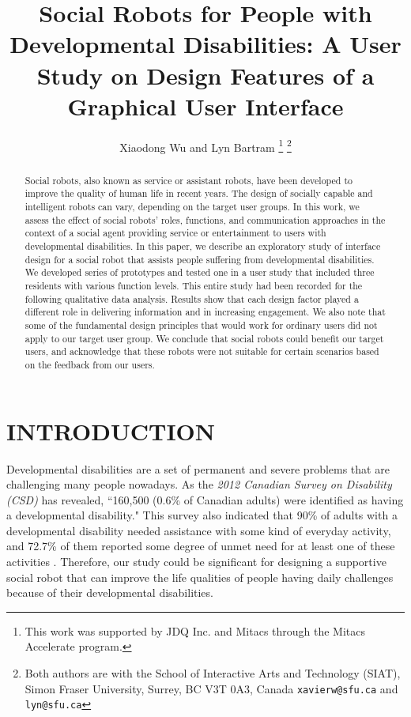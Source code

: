 \documentclass[letterpaper, 10 pt, conference]{ieeeconf}  %
\title{\LARGE \bf
Social Robots for People with Developmental Disabilities: A User Study on Design Features of a Graphical User Interface}
\author{Xiaodong Wu and Lyn Bartram%
\thanks{This work was supported by JDQ Inc. and Mitacs through the Mitacs Accelerate program.}%
\thanks{Both authors are with the School of Interactive Arts and Technology (SIAT), Simon Fraser University, Surrey, BC V3T 0A3, Canada
      {\tt\small xavierw@sfu.ca} and {\tt\small lyn@sfu.ca}}%
}
\begin{document}
\maketitle
\thispagestyle{empty}
\pagestyle{empty}


\begin{abstract}

Social robots, also known as service or assistant robots, have been developed to improve the quality of human life in recent years. The design of socially capable and intelligent robots can vary, depending on the target user groups. In this work, we assess the effect of social robots' roles, functions, and communication approaches in the context of a social agent providing service or entertainment to users with developmental disabilities. In this paper, we describe an exploratory study of interface design for a social robot that assists people suffering from developmental disabilities. We developed series of prototypes and tested one in a user study that included three residents with various function levels. This entire study had been recorded for the following qualitative data analysis. Results show that each design factor played a different role in delivering information and in increasing engagement. We also note that some of the fundamental design principles that would work for ordinary users did not apply to our target user group. We conclude that social robots could benefit our target users, and acknowledge that these robots were not suitable for certain scenarios based on the feedback from our users.

\end{abstract}


\section{INTRODUCTION}

Developmental disabilities are a set of permanent and severe problems that are challenging many people nowadays. As the \textit{2012 Canadian Survey on Disability (CSD)} has revealed,  ``160,500 (0.6\% of Canadian adults) were identified as having a developmental disability." This survey also indicated that 90\% of adults with a developmental disability needed assistance with some kind of everyday activity, and 72.7\% of them reported some degree of unmet need for at least one of these activities \cite{Bizier2015}. Therefore, our study could be significant for designing a supportive social robot that can improve the life qualities of people having daily challenges because of their developmental disabilities.  
\end{document}
